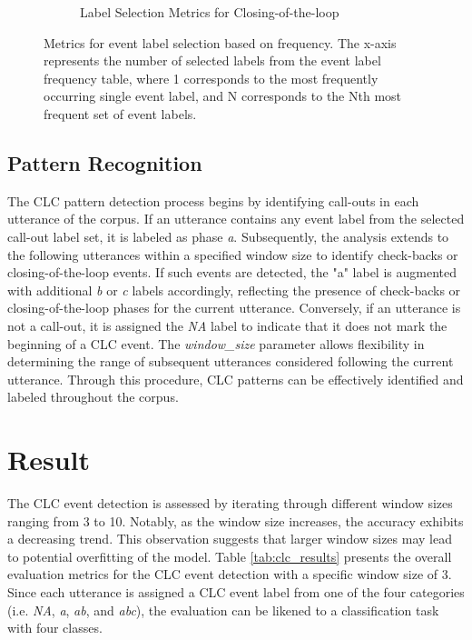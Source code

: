 \documentclass[11pt]{article}
\begin{document}
\begin{figure}
\begin{subfigure}{0.32\textwidth}
    \caption{Label Selection Metrics for Closing-of-the-loop}
    \label{fig:plot3}
  \end{subfigure}

  \caption{Metrics for event label selection based on frequency. The x-axis represents the number of selected labels from the event label frequency table, where 1 corresponds to the most frequently occurring single event label, and N corresponds to the Nth most frequent set of event labels.}
  \label{fig:label_selection}
\end{figure}

\subsection{Pattern Recognition}
The CLC pattern detection process begins by identifying call-outs in each utterance of the corpus. If an utterance contains any event label from the selected call-out label set, it is labeled as phase \textit{a}. Subsequently, the analysis extends to the following utterances within a specified window size to identify check-backs or closing-of-the-loop events. If such events are detected, the "a" label is augmented with additional \textit{b} or \textit{c} labels accordingly, reflecting the presence of check-backs or closing-of-the-loop phases for the current utterance. Conversely, if an utterance is not a call-out, it is assigned the \textit{NA} label to indicate that it does not mark the beginning of a CLC event. The \textit{window\_size} parameter allows flexibility in determining the range of subsequent utterances considered following the current utterance. Through this procedure, CLC patterns can be effectively identified and labeled throughout the corpus.

\section{Result}
The CLC event detection is assessed by iterating through different window sizes ranging from 3 to 10. Notably, as the window size increases, the accuracy exhibits a decreasing trend. This observation suggests that larger window sizes may lead to potential overfitting of the model. Table \ref{tab:clc_results} presents the overall evaluation metrics for the CLC event detection with a specific window size of 3. Since each utterance is assigned a CLC event label from one of the four categories (i.e. \textit{NA}, \textit{a}, \textit{ab}, and \textit{abc}), the evaluation can be likened to a classification task with four classes.
\end{document}
